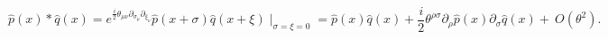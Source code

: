 \begin{equation}
\hat p(x)*\hat q(x)=e^{\frac{i}{2}\theta_{\mu\nu}\partial_{\sigma_{\mu}}\partial_{\xi_{\nu}}}\hat p(x+\sigma )\hat q(x+\xi )\mid_{\sigma =\xi =0}
=\hat p(x)\hat q(x)+\frac{i}{2}\theta^{\rho\sigma}\partial_{\rho}\hat p(x)\partial_{\sigma}\hat q(x)+~O(\theta^{2}).
\label{mw}
\end{equation}

